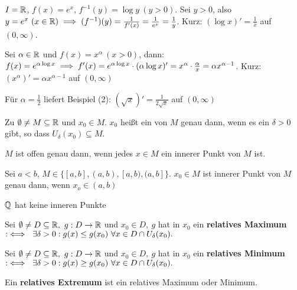 \documentclass[a4paper,twoside,DIV15,BCOR12mm]{scrbook}
\begin{document}
\begin{beispiele}
\item $I=\mathbb{R}$, $f(x) = e^x$, $f^{-1}(y) = \log y\ (y>0)$. Sei $y>0$, also $y=e^x\ (x\in\mathbb{R}) \implies (f^{-1})(y) = \frac{1}{f'(x)} = \frac{1}{e^x} = \frac{1}{y}$. Kurz: $(\log x)' = \frac{1}{x}$ auf $(0,\infty)$.
\item Sei $\alpha \in\mathbb{R}$ und $f(x) = x^\alpha \ (x>0)$, dann: $f(x) = e^{\alpha \log x} \implies f'(x) = e^{\alpha \log x}\cdot (\alpha \log x)' = x^\alpha\cdot\frac{\alpha}{x} = \alpha x^{\alpha-1}$. Kurz: $(x^\alpha)' = \alpha x^{\alpha-1}$ auf $(0,\infty)$
\item Für $\alpha = \frac{1}{2}$ liefert Beispiel (2): $(\sqrt{x})' = \frac{1}{2\sqrt{x}}$ auf $(0,\infty)$
\end{beispiele}

\begin{definition}
Zu $\emptyset \ne M \subseteq \mathbb{R}$ und $x_0\in M$. $x_0$ heißt ein  von $M$ genau dann, wenn es ein $\delta>0$ gibt, so dass $U_\delta(x_0) \subseteq M$.
\end{definition}

\begin{beispiele}
\item $M$ ist offen genau dann, wenn jedes $x\in M$ ein innerer Punkt von $M$ ist.
\item Sei $a<b$, $M\in\{ [a,b], (a,b), [a,b), (a,b] \}$. $x_0 \in M$ ist innerer Punkt von $M$ genau dann, wenn $x_o\in(a,b)$
\item $\mathbb{Q}$ hat keine inneren Punkte
\end{beispiele}

\begin{definition}
Sei $\emptyset \ne D \subseteq \mathbb{R},\ g: D \to \mathbb{R}$ und $x_0 \in D,\ g$ hat in $x_0$ ein \textbf{relatives Maximum} $:\equizu\ \exists \delta>0: g(x)\leq g(x_0)\ \forall x \in D \cap U_\delta(x_0).$

Sei $\emptyset \ne D \subseteq \mathbb{R},\ g: D \to \mathbb{R}$ und $x_0 \in D,\ g$ hat in $x_0$ ein \textbf{relatives Minimum} $:\equizu\ \exists \delta>0: g(x)\geq g(x_0)\ \forall x \in D \cap U_\delta(x_0).$

Ein \textbf{relatives Extremum} ist ein relatives Maximum oder Minimum.
\end{definition}
\end{document}
